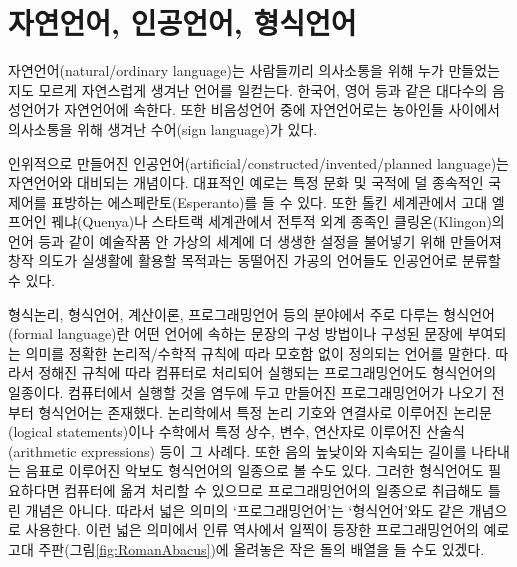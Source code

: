 \section{자연언어, 인공언어, 형식언어}
%
%
%
%
자연언어(natural/ordinary language)는 사람들끼리 의사소통을 위해 누가 만들었는지도 모르게
자연스럽게 생겨난 언어를 일컫는다. 한국어, 영어 등과 같은 대다수의 음성언어가
자연언어에 속한다. 또한 비음성언어 중에 자연언어로는 농아인들 사이에서 의사소통을
위해 생겨난 수어(sign language)가 있다.

인위적으로 만들어진 인공언어(artificial/constructed/invented/planned language)는
자연언어와 대비되는 개념이다. 대표적인 예로는 특정 문화 및 국적에 덜 종속적인
국제어를 표방하는 에스페란토(Esperanto)를 들 수 있다. 또한 톨킨 세계관에서
고대 엘프어인 꿰냐(Quenya)나 스타트랙 세계관에서 전투적 외계 종족인 클링온(Klingon)의
언어 등과 같이 예술작품 안 가상의 세계에 더 생생한 설정을 불어넣기 위해 만들어져
창작 의도가 실생활에 활용할 목적과는 동떨어진 가공의 언어들도 인공언어로 분류할 수 있다.

형식논리, 형식언어, 계산이론, 프로그래밍언어 등의 분야에서 주로 다루는
형식언어(formal language)란 어떤 언어에 속하는 문장의 구성 방법이나
구성된 문장에 부여되는 의미를 정확한 논리적/수학적 규칙에 따라 모호함 없이
정의되는 언어를 말한다. 따라서 정해진 규칙에 따라 컴퓨터로 처리되어 실행되는
프로그래밍언어도 형식언어의 일종이다. 컴퓨터에서 실행할 것을 염두에 두고
만들어진 프로그래밍언어가 나오기 전부터 형식언어는 존재했다.
논리학에서 특정 논리 기호와 연결사로 이루어진 논리문(logical statements)이나
수학에서 특정 상수, 변수, 연산자로 이루어진 산술식(arithmetic expressions)
등이 그 사례다. 또한 음의 높낮이와 지속되는 길이를 나타내는 음표로 이루어진
악보도 형식언어의 일종으로 볼 수도 있다. 그러한 형식언어도 필요하다면
컴퓨터에 옮겨 처리할 수 있으므로 프로그래밍언어의 일종으로 취급해도
틀린 개념은 아니다. 따라서 넓은 의미의 `프로그래밍언어'는 `형식언어'와도
같은 개념으로 사용한다. 이런 넓은 의미에서 인류 역사에서 일찍이 등장한
프로그래밍언어의 예로 고대 주판(그림\;\ref{fig:RomanAbacus})에 올려놓은
작은 돌의 배열을 들 수도 있겠다.


